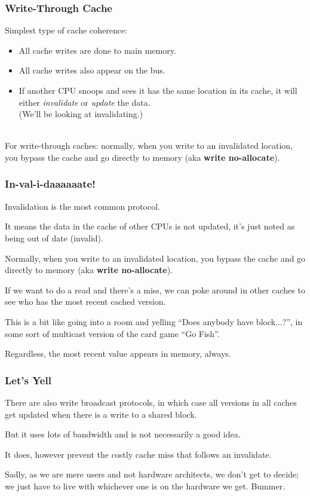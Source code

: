 \begin{frame}
  \frametitle{Write-Through Cache}

  
Simplest type of cache coherence:
  \begin{itemize}
    \item All cache writes are done to main memory.
    \item All cache writes also appear on the bus.
    \item If another CPU snoops and sees it has the same location in
      its cache, it will either {\it invalidate} or {\it update} the
      data.\\ \qquad (We'll be looking at invalidating.)
  \end{itemize}
~\\

    For write-through caches: normally, when you write to an invalidated
    location, you bypass the cache and go directly to memory (aka {\bf
      write no-allocate}).

  
\end{frame}



\begin{frame}
\frametitle{In-val-i-daaaaaate!}

Invalidation is the most common protocol. 

It means the data in the cache of other CPUs is not updated, it's just noted as being out of date (invalid).  

Normally, when you write to an invalidated location, you bypass the cache and go directly to memory (aka {\bf write no-allocate}). 

If we want to do a read and there's a miss, we can poke around in other caches to see who has the most recent cached version. 

This is a bit like going into a room and yelling ``Does anybody have block...?'', in some sort of multicast version of the card game ``Go Fish''. 

Regardless, the most recent value appears in memory, always.


\end{frame}



\begin{frame}
\frametitle{Let's Yell}

There are also write broadcast protocols, in which case all versions in all caches get updated when there is a write to a shared block. 

But it uses lots of bandwidth and is not necessarily a good idea. 

It does, however prevent the costly cache miss that follows an invalidate. 

Sadly, as we are mere users and not hardware architects, we don't get to decide; we just have to live with whichever one is on the hardware we get. Bummer.


\end{frame}

